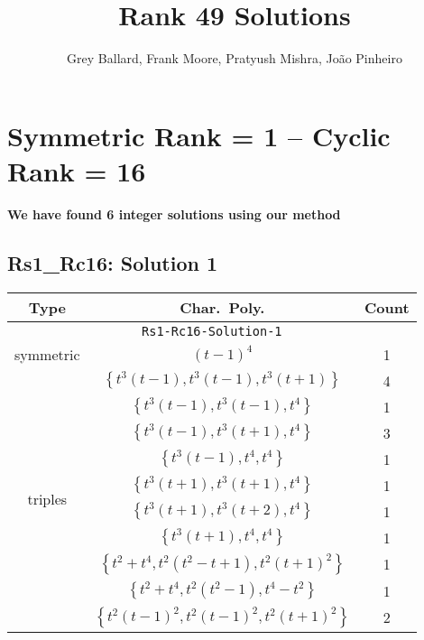 \documentclass{article}
\title{Rank 49 Solutions}
\author{Grey Ballard, Frank Moore, Pratyush Mishra, João Pinheiro}
\date{}
\begin{document}
    \maketitle

    \tableofcontents

    \section{Symmetric Rank = 1 -- Cyclic Rank = 16}
        \textbf{We have found 6 integer solutions using our method}
        \subsection{Rs1\_Rc16: Solution 1}
        \begin{tabular}{|c|c|c|}
        \hline
        \textbf{Type} & \textbf{Char.~Poly.} & \textbf{Count} \\
        \hline \multicolumn{3}{|c|}{\texttt{Rs1-Rc16-Solution-1}} \\ \hline
        \multirow{1}{*}{symmetric}
        & $(t - 1)^4$ & 1 \\
        \hline
        \multirow{10}{*}{triples}
         & $\left\{t^3(t - 1),t^3(t - 1),t^3(t + 1)\right\}$ & 4 \\
         & $\left\{t^3(t - 1),t^3(t - 1),t^4\right\}$ & 1 \\
         & $\left\{t^3(t - 1),t^3(t + 1),t^4\right\}$ & 3 \\
         & $\left\{t^3(t - 1),t^4,t^4\right\}$ & 1 \\
         & $\left\{t^3(t + 1),t^3(t + 1),t^4\right\}$ & 1 \\
         & $\left\{t^3(t + 1),t^3(t + 2),t^4\right\}$ & 1 \\
         & $\left\{t^3(t + 1),t^4,t^4\right\}$ & 1 \\
         & $\left\{t^2 + t^4,t^2(t^2 - t + 1),t^2(t + 1)^2\right\}$ & 1 \\
         & $\left\{t^2 + t^4,t^2(t^2 - 1),t^4 - t^2\right\}$ & 1 \\
         & $\left\{t^2(t - 1)^2,t^2(t - 1)^2,t^2(t + 1)^2\right\}$ & 2 \\
        \hline
        \end{tabular}
        
        \newpage
        
\end{document}
